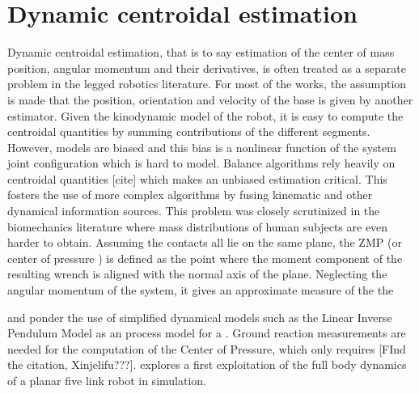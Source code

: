 \section{Dynamic centroidal estimation}
Dynamic centroidal estimation, that is to say estimation of the center of mass position, angular momentum and their derivatives, is often treated as a separate problem in 
the legged robotics literature. For most of the works, the assumption is made that the position, orientation and velocity of the base is given by another 
estimator. Given the kinodynamic model of the robot, it is easy to compute the centroidal quantities by summing contributions of the different segments. However,
models are biased and this bias is a nonlinear function of the system joint configuration which is hard to model. Balance algorithms rely heavily on centroidal quantities [cite] which makes 
an unbiased estimation critical. This fosters the use of more complex algorithms by fusing kinematic and other dynamical information sources.
This problem was closely scrutinized in the biomechanics literature where mass distributions of human subjects are even harder to obtain. 
Assuming the contacts all lie on the same plane, the ZMP (or center of pressure \cite{sardain2004forces}) is defined as the point
where the moment component of the resulting wrench is aligned with the normal axis of the plane. Neglecting the angular momentum of the system, it gives an approximate measure of the
the  

\cite{stephens2011state} and \cite{atkeson2012state} ponder the use of simplified dynamical models 
such as the Linear Inverse Pendulum Model as an process model for a \KalmanF. Ground reaction measurements are needed for the computation of the Center of Pressure, which only requires [FInd the citation, Xinjelifu???].
\cite{atkeson2012state} explores a first exploitation of the full body dynamics of a planar five link robot in simulation.



\cite{stephens2011state}
\cite{atkeson2012state}
\cite{rotella2015humanoid}
\cite{xinjilefu2015center}
\cite{carpentier2016center}
\cite{benallegue2018model}
\cite{piperakis2018nonlinear}
\cite{bailly2019recursive}
\cite{hawley2019external}
\cite{bailly2021optimal}

